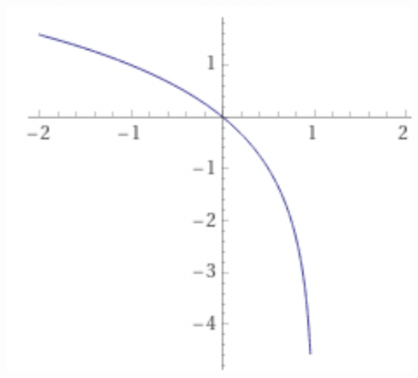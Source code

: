 \documentclass[usenames,dvipsnames]{beamer}
\begin{document}
\begin{frame}
\begin{minipage}[c]{0.5\textwidth}
	\includegraphics[scale=.25]{log2(1-x)}
\end{minipage}

\end{frame}
\end{document}
